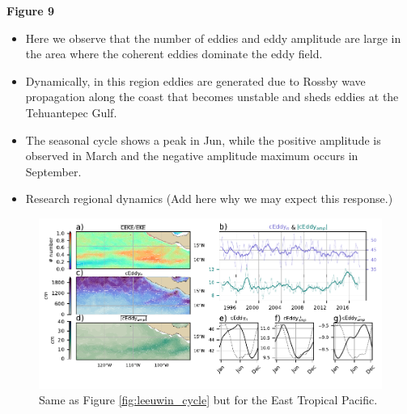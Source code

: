 \documentclass[draft,linenumbers]{agujournal2019}
\begin{document}


	\textbf{Figure 9}
	\begin{itemize}
		\item Here we observe that the number of eddies and eddy amplitude are large in the area where the coherent eddies dominate the eddy field.
		\item Dynamically, in this region eddies are generated due to Rossby wave propagation along the coast that becomes unstable and sheds eddies at the Tehuantepec Gulf.
		\item The seasonal cycle shows a peak in Jun, while the positive amplitude is observed in March and the negative amplitude maximum occurs in September. 
		\item Research regional dynamics (Add here why we may expect this response.)
	\end{itemize}

	\begin{figure}
	    \centering
	    \includegraphics[width=1\textwidth]{figures/regional_ratios_and_stats_V3_3.pdf}
	    \caption{Same as Figure \ref{fig:leeuwin_cycle} but for the East Tropical Pacific.}
	    \label{fig:south_atlantic_cycle}
	\end{figure}
	
\end{document}
